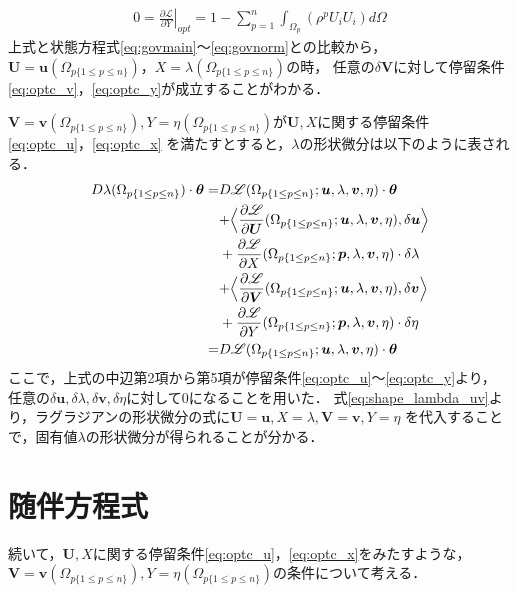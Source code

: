\begin{align}
	0=\left.\frac{\partial \mathscr{L}}{\partial Y}\right|_{opt}=1- \sum_{p=1}^{n}\int_{\Omega_{p}}(\rho^{p}U_{i}U_{i}) d\Omega
	\label{eq:lagrange_yderivative}
\end{align}
上式と状態方程式\eqref{eq:govmain}～\eqref{eq:govnorm}との比較から，$\bm{U}=\bm{u}(\Omega_{p\{1\leq p\leq n\}})$，$X=\lambda(\Omega_{p\{1\leq p\leq n\}})$の時，
任意の$\delta \bm{V}$に対して停留条件\eqref{eq:optc_v}，\eqref{eq:optc_y}が成立することがわかる．

$\bm{V}=\bm{v}(\Omega_{p\{1\leq p\leq n\}}),Y=\eta(\Omega_{p\{1\leq p\leq n\}})$が$\bm{U},X$に関する停留条件\eqref{eq:optc_u}，\eqref{eq:optc_x}
を満たすとすると，$\lambda$の形状微分は以下のように表される．
\begin{align}
	D\lambda(\Omega_{p\{1\leq p\leq n\}})\cdot\bm{\theta}
	=&D\mathscr{L}(\Omega_{p\{1\leq p\leq n\}};\bm{u},\lambda,\bm{v},\eta)\cdot\bm{\theta}
	\nonumber
	\\
	&+\Bigr\langle \frac{\partial \mathscr{L}}{\partial \bm{U}}(\Omega_{p\{1\leq p\leq n\}};\bm{u},\lambda,\bm{v},\eta),
	\delta\bm{u} \Bigl\rangle
	\nonumber
	\\
	&+\frac{\partial \mathscr{L}}{\partial X}(\Omega_{p\{1\leq p\leq n\}};\bm{p},\lambda,\bm{v},\eta)\cdot
	\delta\lambda
	\nonumber
	\\
	&+\Bigr\langle \frac{\partial \mathscr{L}}{\partial \bm{V}}(\Omega_{p\{1\leq p\leq n\}};\bm{u},\lambda,\bm{v},\eta),
	\delta\bm{v} \Bigl\rangle
	\nonumber
	\\
	&+\frac{\partial \mathscr{L}}{\partial Y}(\Omega_{p\{1\leq p\leq n\}};\bm{p},\lambda,\bm{v},\eta)\cdot
	\delta\eta
	\nonumber
	\\
	=&D\mathscr{L}(\Omega_{p\{1\leq p\leq n\}};\bm{u},\lambda,\bm{v},\eta)\cdot\bm{\theta}
	\label{eq:shape_lambda_uv}
\end{align}
ここで，上式の中辺第2項から第5項が停留条件\eqref{eq:optc_u}～\eqref{eq:optc_y}より，
任意の$\delta\bm{u},\delta\lambda,\delta\bm{v},\delta\eta$に対して0になることを用いた．
式\eqref{eq:shape_lambda_uv}より，ラグラジアンの形状微分の式に$\bm{U}=\bm{u},X=\lambda,\bm{V}=\bm{v},Y=\eta$
を代入することで，固有値$\lambda$の形状微分が得られることが分かる．

\section{随伴方程式}
続いて，$\bm{U},X$に関する停留条件\eqref{eq:optc_u}，\eqref{eq:optc_x}をみたすような，
$\bm{V}=\bm{v}(\Omega_{p\{1\leq p\leq n\}}),Y=\eta(\Omega_{p\{1\leq p\leq n\}})$の条件について考える．

